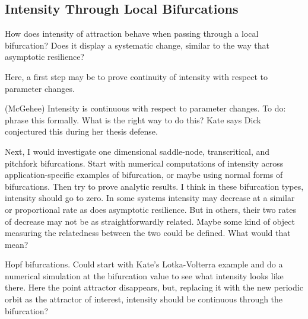 
\subsection{Intensity Through Local Bifurcations}

How does intensity of attraction behave when passing through a local bifurcation? Does it display a systematic change, similar to the way that asymptotic resilience? 


Here, a first step may be to prove continuity of intensity with respect to parameter changes. 

\begin{conjecture}(McGehee)
	Intensity is continuous with respect to parameter changes. To do: phrase this formally. What is the right way to do this? Kate says Dick conjectured this during her thesis defense.
\end{conjecture}

Next, I would investigate one dimensional saddle-node, transcritical, and pitchfork bifurcations. 
%
Start with numerical computations of intensity across application-specific examples of bifurcation, or maybe using normal forms of bifurcations. Then try to prove analytic results. 
%
I think in these bifurcation types, intensity should go to zero. In some systems intensity may decrease at a similar or proportional rate as does asymptotic resilience. But in others, their two rates of decrease may not be as straightforwardly related. Maybe some kind of object measuring the relatedness between the two could be defined. What would that mean?



Hopf bifurcations. Could start with Kate's Lotka-Volterra example and do a numerical simulation at the bifurcation value to see what intensity looks like there. Here the point attractor disappears, but, replacing it with the new periodic orbit as the attractor of interest, intensity should be continuous through the bifurcation?  %

